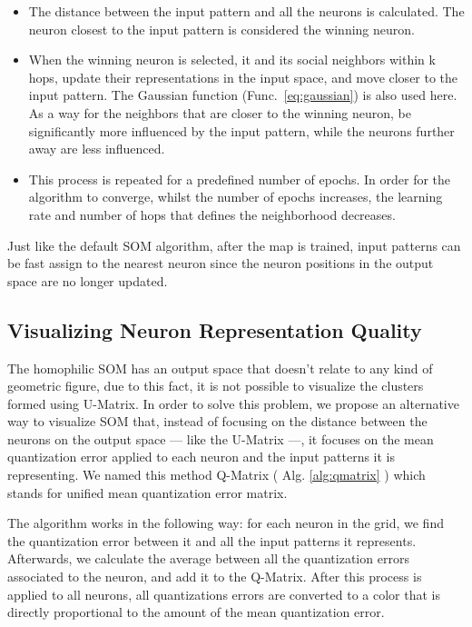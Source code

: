 \begin{itemize}
  \item The distance between the input pattern and all the neurons is calculated. The neuron closest to the input pattern is considered the winning neuron.
  \item When the winning neuron is selected, it and its social neighbors within k hops, update their representations in the input space, and move closer to the input pattern. The Gaussian function (Func.~\ref{eq:gaussian}) is also used here. As a way for the neighbors that are closer to the winning neuron, be significantly more influenced by the input pattern, while the neurons further away are less influenced. 
  \item This process is repeated for a predefined number of epochs. In order for the algorithm to converge, whilst the number of epochs increases, the learning rate and number of hops that defines the neighborhood decreases.
\end{itemize}

Just like the default \ac{SOM} algorithm, after the map is trained, input patterns can be fast assign to the nearest neuron since the neuron positions in the output space are no longer updated.

\subsection{Visualizing Neuron Representation Quality}
\label{sub:visualizing_neuron_representation_quality}
The homophilic \ac{SOM} has an output space that doesn't relate to any kind of geometric figure, due to this fact, it is not possible to visualize the clusters formed using \ac{U-Matrix}. In order to solve this problem, we propose an alternative way to visualize \ac{SOM} that, instead of focusing on the distance between the neurons on the output space --- like the \ac{U-Matrix} ---, it focuses on the mean quantization error applied to each neuron and the input patterns it is representing. We named this method Q-Matrix ( Alg. \ref{alg:qmatrix} ) which stands for unified mean quantization error matrix.



The algorithm works in the following way: for each neuron in the grid, we find the quantization error between it and all the input patterns it represents. Afterwards, we calculate the average between all the quantization errors associated to the neuron, and add it to the Q-Matrix. After this process is applied to all neurons, all quantizations errors are converted to a color that is directly proportional to the amount of the mean quantization error. 

